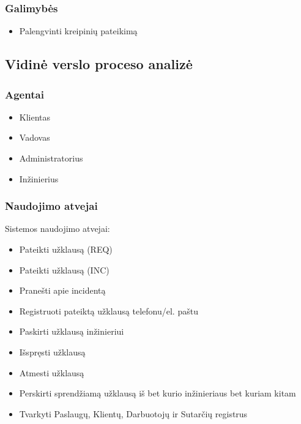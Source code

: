		\subsubsection{Galimybės}

			\begin{itemize}
				\item Palengvinti kreipinių pateikimą 
			\end{itemize}

	\subsection{Vidinė verslo proceso analizė}

		\subsubsection{Agentai}

			\begin{itemize}
				\item Klientas
				\item Vadovas
				\item Administratorius
				\item Inžinierius
			\end{itemize}

			\subsubsection{Naudojimo atvejai}

			Sistemos naudojimo atvejai:
			\begin{itemize}
				\item Pateikti užklausą (REQ)
				\item Pateikti užklausą (INC)
				\item Pranešti apie incidentą
				\item Registruoti pateiktą užklausą telefonu/el. paštu
				\item Paskirti užklausą inžinieriui
				\item Išspręsti užklausą
				\item Atmesti užklausą
				\item Perskirti sprendžiamą užklausą iš bet kurio inžinieriaus bet kuriam kitam
				\item Tvarkyti Paslaugų, Klientų, Darbuotojų ir Sutarčių registrus
			\end{itemize}



